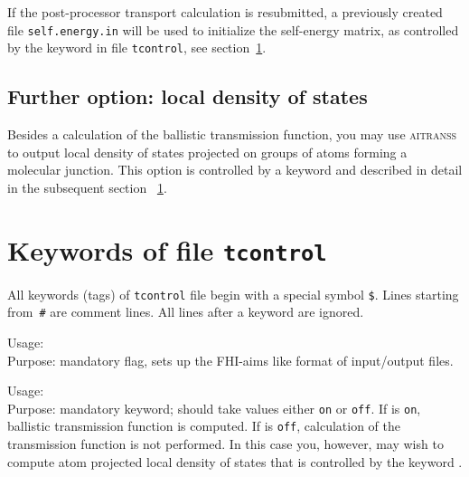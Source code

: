 If the post-processor transport calculation is resubmitted, a
previously created file \linebreak \verb,self.energy.in, will be
used to initialize the self-energy matrix, as controlled by the 
keyword  in file \verb,tcontrol,,
see section~\ref{sec:aitranss:keywords}.

\subsection{%
Further option: local density of states} 
\label{subsec:aitranss:ldos}

Besides a calculation of the ballistic transmission function, you may use \textsc{aitranss}
to output local density of states projected on groups of atoms forming a molecular junction.
This option is controlled by a keyword   and described in detail
in the subsequent section ~\ref{sec:aitranss:keywords}.

\section{Keywords of file \texttt{tcontrol}} 
\label{sec:aitranss:keywords}

All keywords (tags) of \texttt{tcontrol} file begin with a special symbol
\verb,$,. Lines starting from~\verb,#, are comment lines.  All lines
after a keyword  are ignored.

{
 \noindent 
 Usage:      \\[1.0ex]
 Purpose:  mandatory flag, sets up the FHI-aims like format of
           input/output files. \\
} 


{
 \noindent 
 Usage: \quad {} \\[1.0ex] 
 Purpose: mandatory keyword;  should take values either \texttt{on} or \texttt{off}. 
 If  is \texttt{on}, ballistic transmission function is computed. 
 If  is \texttt{off}, calculation of the transmission function is not performed. 
 In this case you, however, may wish to compute atom projected local density of states that 
 is controlled by the keyword .  \\
}


